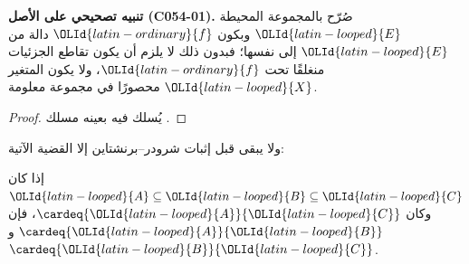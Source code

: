 \documentclass[../../../include/open-logic-section]{subfiles}
\begin{document}
\textbf{تنبيه تصحيحي على الأصل (C054-01).} صُرّح بالمجموعة المحيطة $\OLId{latin-looped}{E}$ وبكون
$\OLId{latin-ordinary}{f}$ دالة من $\OLId{latin-looped}{E}$ إلى نفسها؛ فبدون ذلك لا يلزم أن يكون تقاطع الجزئيات
منغلقًا تحت $\OLId{latin-ordinary}{f}$، ولا يكون المتغير $\OLId{latin-looped}{X}$ محصورًا في مجموعة معلومة.

\begin{proof}
يُسلك فيه بعينه مسلك .
\end{proof}

ولا يبقى قبل إثبات شرودر–برنشتاين إلا القضية الآتية:

\begin{prop}
إذا كان $\OLId{latin-looped}{A} \subseteq \OLId{latin-looped}{B} \subseteq \OLId{latin-looped}{C}$ وكان $\cardeq{\OLId{latin-looped}{A}}{\OLId{latin-looped}{C}}$، فإن $\cardeq{\OLId{latin-looped}{A}}{\OLId{latin-looped}{B}}$ و$\cardeq{\OLId{latin-looped}{B}}{\OLId{latin-looped}{C}}$.
\end{prop}
\end{document}
